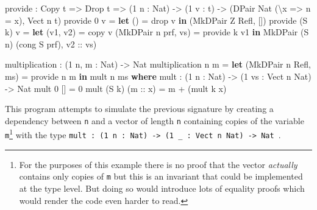 \documentclass[
]{article}
\newenvironment{Shaded}{}{}
\newcommand{\DataTypeTok}[1]{\textcolor[rgb]{0.56,0.13,0.00}{#1}}
\newcommand{\DecValTok}[1]{\textcolor[rgb]{0.25,0.63,0.44}{#1}}
\newcommand{\FunctionTok}[1]{\textcolor[rgb]{0.02,0.16,0.49}{#1}}
\newcommand{\KeywordTok}[1]{\textcolor[rgb]{0.00,0.44,0.13}{\textbf{#1}}}
\newcommand{\NormalTok}[1]{#1}
\newcommand{\OperatorTok}[1]{\textcolor[rgb]{0.40,0.40,0.40}{#1}}
\newcommand{\OtherTok}[1]{\textcolor[rgb]{0.00,0.44,0.13}{#1}}
\begin{document}
\begin{Shaded}
\begin{Highlighting}[]
\NormalTok{provide }\OperatorTok{:} \DataTypeTok{Copy}\NormalTok{ t }\OtherTok{=\textgreater{}} \DataTypeTok{Drop}\NormalTok{ t }\OtherTok{=\textgreater{}}\NormalTok{ (}\DecValTok{1}\NormalTok{ n }\OperatorTok{:} \DataTypeTok{Nat}\NormalTok{) }\OtherTok{{-}\textgreater{}}\NormalTok{ (}\DecValTok{1}\NormalTok{ v }\OperatorTok{:}\NormalTok{ t) }
       \OtherTok{{-}\textgreater{}}\NormalTok{ (}\DataTypeTok{DPair} \DataTypeTok{Nat}\NormalTok{ (\textbackslash{}x }\OtherTok{=\textgreater{}}\NormalTok{ n }\OtherTok{=}\NormalTok{ x), }\DataTypeTok{Vect}\NormalTok{ n t)}
\NormalTok{provide }\DecValTok{0}\NormalTok{ v }\OtherTok{=} \KeywordTok{let}\NormalTok{ () }\OtherTok{=} \FunctionTok{drop}\NormalTok{ v }\KeywordTok{in}\NormalTok{ (}\DataTypeTok{MkDPair} \DataTypeTok{Z} \DataTypeTok{Refl}\NormalTok{, [])}
\NormalTok{provide (}\DataTypeTok{S}\NormalTok{ k) v }\OtherTok{=} \KeywordTok{let}\NormalTok{ (v1, v2) }\OtherTok{=}\NormalTok{ copy v}
\NormalTok{                      (}\DataTypeTok{MkDPair}\NormalTok{ n prf, vs) }\OtherTok{=}\NormalTok{ provide k v1}
                   \KeywordTok{in} \DataTypeTok{MkDPair}\NormalTok{ (}\DataTypeTok{S}\NormalTok{ n) (cong }\DataTypeTok{S}\NormalTok{ prf),}\OtherTok{ v2 ::}\NormalTok{ vs)}

\NormalTok{multiplication }\OperatorTok{:}\NormalTok{ (}\DecValTok{1}\NormalTok{ n, m }\OperatorTok{:} \DataTypeTok{Nat}\NormalTok{) }\OtherTok{{-}\textgreater{}} \DataTypeTok{Nat}
\NormalTok{multiplication n m }\OtherTok{=} \KeywordTok{let}\NormalTok{ (}\DataTypeTok{MkDPair}\NormalTok{ n\textquotesingle{} }\DataTypeTok{Refl}\NormalTok{, ms) }\OtherTok{=}\NormalTok{ provide n m }\KeywordTok{in}\NormalTok{ mult n\textquotesingle{} ms}
  \KeywordTok{where}
\NormalTok{    mult }\OperatorTok{:}\NormalTok{ (}\DecValTok{1}\NormalTok{ n }\OperatorTok{:} \DataTypeTok{Nat}\NormalTok{) }\OtherTok{{-}\textgreater{}}\NormalTok{ (}\DecValTok{1}\NormalTok{ vs }\OperatorTok{:} \DataTypeTok{Vect}\NormalTok{ n }\DataTypeTok{Nat}\NormalTok{) }\OtherTok{{-}\textgreater{}} \DataTypeTok{Nat}
\NormalTok{    mult }\DecValTok{0}\NormalTok{ [] }\OtherTok{=} \DecValTok{0}
\NormalTok{    mult (}\DataTypeTok{S}\NormalTok{ k) (}\OtherTok{m ::}\NormalTok{ x) }\OtherTok{=}\NormalTok{ m }\OperatorTok{+}\NormalTok{ (mult k x)}
\end{Highlighting}
\end{Shaded}

This program attempts to simulate the previous signature by creating a
dependency between \texttt{n} and a vector of length \texttt{n}
containing copies of the variable \texttt{m}\footnote{For the purposes
  of this example there is no proof that the vector \emph{actually}
  contains only copies of \texttt{m} but this is an invariant that could
  be implemented at the type level. But doing so would introduce lots of
  equality proofs which would render the code even harder to read.} with
the type
\texttt{mult\ :\ (1\ n\ :\ Nat)\ -\textgreater{}\ (1\ \_\ :\ Vect\ n\ Nat)\ -\textgreater{}\ Nat~}.
\end{document}
